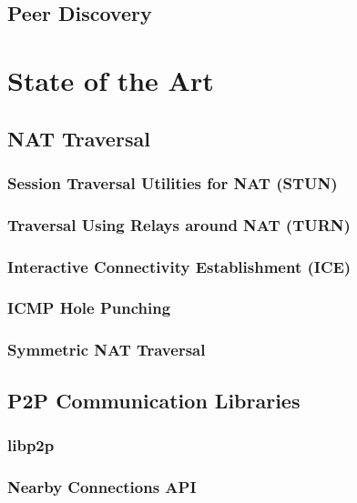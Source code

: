 \section{Peer Discovery}


\chapter{State of the Art}

\section{NAT Traversal}

\subsection{Session Traversal Utilities for NAT (STUN)}

\subsection{Traversal Using Relays around NAT (TURN)}

\subsection{Interactive Connectivity Establishment (ICE)}

\subsection{ICMP Hole Punching}

\subsection{Symmetric NAT Traversal}

\section{P2P Communication Libraries}

\subsection{libp2p}

\subsection{Nearby Connections API}

